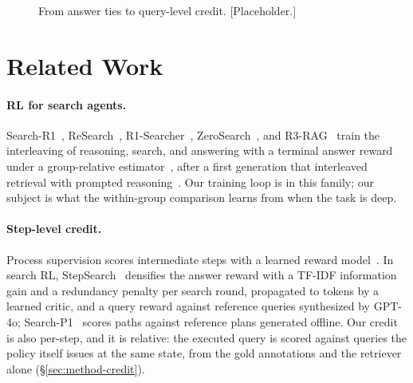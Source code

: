 
\begin{figure}[t]
\centering
{}
\caption{From answer ties to query-level credit. [Placeholder.]}
\label{fig:mechanism}
\end{figure}

\section{Related Work}
\label{sec:related}

\paragraph{RL for search agents.}
Search-R1~\citep{jin2025searchr1}, ReSearch~\citep{chen2025research},
R1-Searcher~\citep{song2025r1searcher},
ZeroSearch~\citep{sun2026zerosearch}, and R3-RAG~\citep{li2025r3} train
the interleaving of reasoning, search, and answering with a terminal
answer reward under a group-relative
estimator~\citep{shao2024deepseekmath,ahmadian2024rloo,kool2019buy},
after a first generation that interleaved retrieval with prompted
reasoning~\citep{yao2023react,press2023measuring,trivedi2023interleaving}.
Our training loop is in this family; our subject is what the
within-group comparison learns from when the task is deep.

\paragraph{Step-level credit.}
Process supervision scores intermediate steps with a learned reward
model~\citep{lightman2024verify,uesato2022solving}. In search RL,
StepSearch~\citep{zheng-etal-2025-stepsearch} densifies the answer
reward with a TF-IDF information gain and a redundancy penalty per
search round, propagated to tokens by a learned critic, and a query
reward against reference queries synthesized by GPT-4o;
Search-P1~\citep{xia2026searchp1} scores paths against reference plans
generated offline. Our credit is also per-step, and it is relative: the
executed query is scored against queries the policy itself issues at
the same state, from the gold annotations and the retriever alone
(\S\ref{sec:method-credit}).

